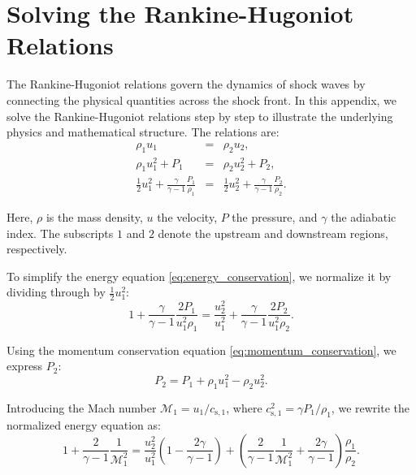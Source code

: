 \section{Solving the Rankine-Hugoniot Relations}
\label{app:RH}

The Rankine-Hugoniot relations govern the dynamics of shock waves by connecting the physical quantities across the shock front. In this appendix, we solve the Rankine-Hugoniot relations step by step to illustrate the underlying physics and mathematical structure. The relations are:
%
\begin{eqnarray}
\rho_1 u_1 & = & \rho_2 u_2, \label{eq:mass_conservation} \\
\rho_1 u_1^2 + P_1 & = & \rho_2 u_2^2 + P_2, \label{eq:momentum_conservation} \\
\frac{1}{2} u_1^2 + \frac{\gamma}{\gamma - 1} \frac{P_1}{\rho_1} & = & \frac{1}{2} u_2^2 + \frac{\gamma}{\gamma - 1} \frac{P_2}{\rho_2}. \label{eq:energy_conservation}
\end{eqnarray}

Here, \(\rho\) is the mass density, \(u\) the velocity, \(P\) the pressure, and \(\gamma\) the adiabatic index. The subscripts \(1\) and \(2\) denote the upstream and downstream regions, respectively.

To simplify the energy equation \eqref{eq:energy_conservation}, we normalize it by dividing through by \(\frac{1}{2} u_1^2\):
\begin{equation}
1 + \frac{\gamma}{\gamma - 1} \frac{2 P_1}{u_1^2 \rho_1} = \frac{u_2^2}{u_1^2} + \frac{\gamma}{\gamma - 1} \frac{2 P_2}{u_1^2 \rho_2}.
\end{equation}

Using the momentum conservation equation \eqref{eq:momentum_conservation}, we express \(P_2\):
\begin{equation}
P_2 = P_1 + \rho_1 u_1^2 - \rho_2 u_2^2.
\end{equation}

Introducing the Mach number \(\mathcal{M}_1 = u_1 / c_{\text{s}, 1}\), where \(c_{\text{s}, 1}^2 = \gamma P_1 / \rho_1\), we rewrite the normalized energy equation as:
\begin{equation}
1 + \frac{2}{\gamma - 1} \frac{1}{\mathcal{M}_1^2} = \frac{u_2^2}{u_1^2} \left(1 - \frac{2\gamma}{\gamma - 1} \right) + \left( \frac{2}{\gamma - 1} \frac{1}{\mathcal{M}_1^2} + \frac{2\gamma}{\gamma - 1} \right) \frac{\rho_1}{\rho_2}.
\end{equation}

